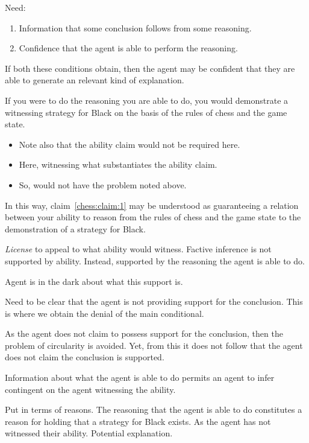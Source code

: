 \documentclass[10pt]{article}
\begin{document}
\begin{note}
  Need:
  \begin{enumerate}
  \item Information that some conclusion follows from some reasoning.
  \item Confidence that the agent is able to perform the reasoning.
  \end{enumerate}
  If both these conditions obtain, then the agent may be confident that they are able to generate an {\color{red} relevant kind of} explanation.
\end{note}

If you were to do the reasoning you are able to do, you would demonstrate a witnessing strategy for Black on the basis of the rules of chess and the game state.

\begin{itemize}
\item Note also that the ability claim would not be required here.
\item Here, witnessing what substantiates the ability claim.
\item So, would not have the problem noted above.
\end{itemize}

In this way, claim~\ref{chess:claim:1} may be understood as guaranteeing a relation between your ability to reason from the rules of chess and the game state to the demonstration of a strategy for Black.

\emph{License} to appeal to what ability would witness.
Factive inference is not supported by ability.
Instead, supported by the reasoning the agent is able to do.

Agent is in the dark about what this support is.

Need to be clear that the agent is not providing support for the conclusion.
This is where we obtain the denial of the main conditional.

As the agent does not claim to possess support for the conclusion, then the problem of circularity is avoided.
Yet, from this it does not follow that the agent does not claim the conclusion is supported.

Information about what the agent is able to do permits an agent to infer contingent on the agent witnessing the ability.

Put in terms of reasons.
The reasoning that the agent is able to do constitutes a reason for holding that a strategy for Black exists.
As the agent has not witnessed their ability.
Potential explanation.
\end{document}
